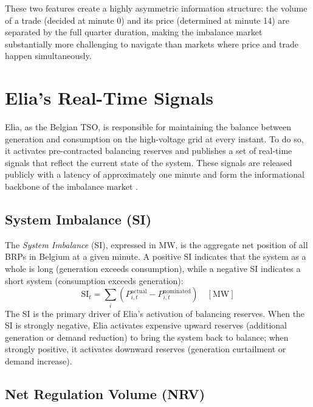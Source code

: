 These two features create a highly asymmetric information structure: the volume of a trade (decided at minute 0) and its price (determined at minute 14) are separated by the full quarter duration, making the imbalance market substantially more challenging to navigate than markets where price and trade happen simultaneously.

\section{Elia's Real-Time Signals}
\label{sec:elia-signals}

Elia, as the Belgian TSO, is responsible for maintaining the balance between generation and consumption on the high-voltage grid at every instant. To do so, it activates pre-contracted balancing reserves and publishes a set of real-time signals that reflect the current state of the system. These signals are released publicly with a latency of approximately one minute and form the informational backbone of the imbalance market \cite{[search: Elia TSO Belgium real-time balancing signals open data publication]}.

\subsection{System Imbalance (SI)}

The \textit{System Imbalance} (SI), expressed in MW, is the aggregate net position of all BRPs in Belgium at a given minute. A positive SI indicates that the system as a whole is long (generation exceeds consumption), while a negative SI indicates a short system (consumption exceeds generation):
\[
    \text{SI}_t = \sum_{i} \left( P^{\text{actual}}_{i,t} - P^{\text{nominated}}_{i,t} \right) \quad [\text{MW}]
\]
The SI is the primary driver of Elia's activation of balancing reserves. When the SI is strongly negative, Elia activates expensive upward reserves (additional generation or demand reduction) to bring the system back to balance; when strongly positive, it activates downward reserves (generation curtailment or demand increase).

\subsection{Net Regulation Volume (NRV)}

